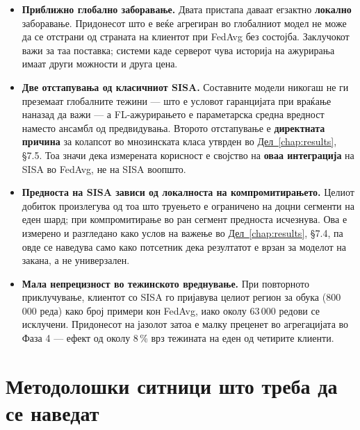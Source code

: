 \begin{itemize}
  \item \textbf{Приближно глобално заборавање.} Двата пристапа даваат егзактно \textbf{локално} заборавање. Придонесот што е веќе агрегиран во глобалниот модел не може да се отстрани од страната на клиентот при FedAvg без состојба. Заклучокот важи за таа поставка; системи каде серверот чува историја на ажурирања имаат други можности и друга цена.
  \item \textbf{Две отстапувања од класичниот SISA.} Составните модели никогаш не ги преземаат глобалните тежини --- што е условот гаранцијата при враќање наназад да важи --- а FL-ажурирањето е параметарска средна вредност наместо ансамбл од предвидувања. Второто отстапување е \textbf{директната причина} за колапсот во мнозинската класа утврден во \hyperref[chap:results]{Дел~\ref*{chap:results}}, §7.5. Тоа значи дека измерената корисност е својство на \textbf{оваа интеграција} на SISA во FedAvg, не на SISA воопшто.
  \item \textbf{Предноста на SISA зависи од локалноста на компромитирањето.} Целиот добиток произлегува од тоа што труењето е ограничено на доцни сегменти на еден шард; при компромитирање во ран сегмент предноста исчезнува. Ова е измерено и разгледано како услов на важење во \hyperref[chap:results]{Дел~\ref*{chap:results}}, §7.4, па овде се наведува само како потсетник дека резултатот е врзан за моделот на закана, а не универзален.
  \item \textbf{Мала непрецизност во тежинското вреднување.} При повторното приклучување, клиентот со SISA го пријавува целиот регион за обука (800\,000 реда) како број примери кон FedAvg, иако околу 63\,000 редови се исклучени. Придонесот на јазолот затоа е малку преценет во агрегацијата во Фаза 4 --- ефект од околу 8\,\% врз тежината на еден од четирите клиенти.
\end{itemize}

\section{Методолошки ситници што треба да се наведат}

